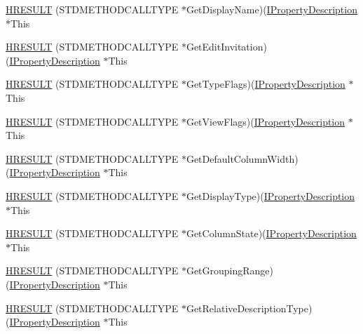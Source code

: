 \begin{DoxyCompactItemize}
\item 
\hyperlink{struct_i_property_description_vtbl_a7c3e738bcfa6ac48491e5921a65d040c}{H\+R\+E\+S\+U\+LT} (S\+T\+D\+M\+E\+T\+H\+O\+D\+C\+A\+L\+L\+T\+Y\+PE $\ast$Get\+Display\+Name)(\hyperlink{propsys_8h_a9dea4496617289c54b3e67bc2a0e8eca}{I\+Property\+Description} $\ast$This
\item 
\hyperlink{struct_i_property_description_vtbl_a6396041d22b6b09c973b1b68ddd827b3}{H\+R\+E\+S\+U\+LT} (S\+T\+D\+M\+E\+T\+H\+O\+D\+C\+A\+L\+L\+T\+Y\+PE $\ast$Get\+Edit\+Invitation)(\hyperlink{propsys_8h_a9dea4496617289c54b3e67bc2a0e8eca}{I\+Property\+Description} $\ast$This
\item 
\hyperlink{struct_i_property_description_vtbl_a5af017f97e7fcc41d30f6fcca4d4abec}{H\+R\+E\+S\+U\+LT} (S\+T\+D\+M\+E\+T\+H\+O\+D\+C\+A\+L\+L\+T\+Y\+PE $\ast$Get\+Type\+Flags)(\hyperlink{propsys_8h_a9dea4496617289c54b3e67bc2a0e8eca}{I\+Property\+Description} $\ast$This
\item 
\hyperlink{struct_i_property_description_vtbl_a0a505f4c03bfcd4bb39c50de4eec9be6}{H\+R\+E\+S\+U\+LT} (S\+T\+D\+M\+E\+T\+H\+O\+D\+C\+A\+L\+L\+T\+Y\+PE $\ast$Get\+View\+Flags)(\hyperlink{propsys_8h_a9dea4496617289c54b3e67bc2a0e8eca}{I\+Property\+Description} $\ast$This
\item 
\hyperlink{struct_i_property_description_vtbl_aff5b1a80c28f8b1e2c8754ffc7ee94c9}{H\+R\+E\+S\+U\+LT} (S\+T\+D\+M\+E\+T\+H\+O\+D\+C\+A\+L\+L\+T\+Y\+PE $\ast$Get\+Default\+Column\+Width)(\hyperlink{propsys_8h_a9dea4496617289c54b3e67bc2a0e8eca}{I\+Property\+Description} $\ast$This
\item 
\hyperlink{struct_i_property_description_vtbl_a4f39a77eaa66d2e6a8f707621b0b35d4}{H\+R\+E\+S\+U\+LT} (S\+T\+D\+M\+E\+T\+H\+O\+D\+C\+A\+L\+L\+T\+Y\+PE $\ast$Get\+Display\+Type)(\hyperlink{propsys_8h_a9dea4496617289c54b3e67bc2a0e8eca}{I\+Property\+Description} $\ast$This
\item 
\hyperlink{struct_i_property_description_vtbl_aa6835c48cb92e9c2bd6f465d0bfac8f8}{H\+R\+E\+S\+U\+LT} (S\+T\+D\+M\+E\+T\+H\+O\+D\+C\+A\+L\+L\+T\+Y\+PE $\ast$Get\+Column\+State)(\hyperlink{propsys_8h_a9dea4496617289c54b3e67bc2a0e8eca}{I\+Property\+Description} $\ast$This
\item 
\hyperlink{struct_i_property_description_vtbl_adac8820016505dd3ca78ee74d9445c18}{H\+R\+E\+S\+U\+LT} (S\+T\+D\+M\+E\+T\+H\+O\+D\+C\+A\+L\+L\+T\+Y\+PE $\ast$Get\+Grouping\+Range)(\hyperlink{propsys_8h_a9dea4496617289c54b3e67bc2a0e8eca}{I\+Property\+Description} $\ast$This
\item 
\hyperlink{struct_i_property_description_vtbl_aea424c892ec6337a01bce00ecf93cff0}{H\+R\+E\+S\+U\+LT} (S\+T\+D\+M\+E\+T\+H\+O\+D\+C\+A\+L\+L\+T\+Y\+PE $\ast$Get\+Relative\+Description\+Type)(\hyperlink{propsys_8h_a9dea4496617289c54b3e67bc2a0e8eca}{I\+Property\+Description} $\ast$This

\end{DoxyCompactItemize}
